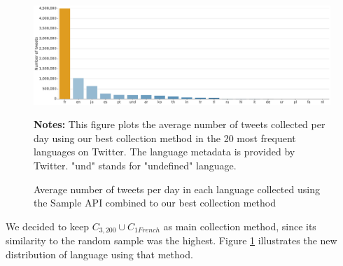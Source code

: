 \begin{figure}
\begin{center}
\includegraphics[width=1\textwidth]{figures/HistogramLanguagesFilter.pdf}
\end{center}
\scriptsize \textbf{Notes:} This figure plots the average number of tweets collected per day using our best collection method in the 20 most frequent languages on Twitter. The language metadata is provided by Twitter. "und" stands for "undefined" language.

\caption{Average number of tweets per day in each language collected using the Sample API combined to our best collection method}
\label{Figure:HistogramLanguagesFilter}
\end{figure}



We decided to keep $C_{3,200} \cup C_{1French}$ as main collection method, since its similarity to the random sample was the highest. Figure \ref{Figure:HistogramLanguagesFilter} illustrates the new distribution of language using that method.

